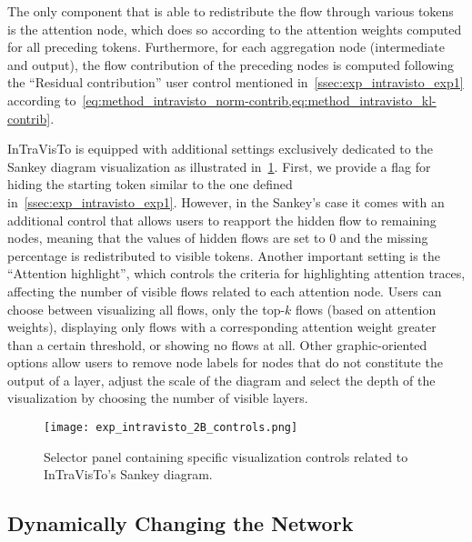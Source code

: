 The only component that is able to redistribute the flow through various tokens is the attention node, which does so according to the attention weights computed for all preceding tokens.
Furthermore, for each aggregation node (intermediate and output), the flow contribution of the preceding nodes is computed following the ``Residual contribution'' user control mentioned in~\cref{ssec:exp_intravisto_exp1} according to~\cref{eq:method_intravisto_norm-contrib,eq:method_intravisto_kl-contrib}.

InTraVisTo is equipped with additional settings exclusively dedicated to the Sankey diagram visualization as illustrated in~\cref{fig:exp_intravisto_2_B}.
First, we provide a flag for hiding the starting token similar to the one defined in~\cref{ssec:exp_intravisto_exp1}.
However, in the Sankey's case it comes with an additional control that allows users to reapport the hidden flow to remaining nodes, meaning that the values of hidden flows are set to $0$ and the missing percentage is redistributed to visible tokens.
Another important setting is the ``Attention highlight'', which controls the criteria for highlighting attention traces, affecting the number of visible flows related to each attention node.
Users can choose between visualizing all flows, only the top-$k$ flows (based on attention weights), displaying only flows with a corresponding attention weight greater than a certain threshold, or showing no flows at all.
Other graphic-oriented options allow users to remove node labels for nodes that do not constitute the output of a layer, adjust the scale of the diagram and select the depth of the visualization by choosing the number of visible layers.

\begin{figure}[t!]
    \centering
    \texttt{[image: exp\_intravisto\_2B\_controls.png]}
    \caption{Selector panel containing specific visualization controls related to InTraVisTo's Sankey diagram.}
    \label{fig:exp_intravisto_2_B}
\end{figure}

\subsection{Dynamically Changing the Network}\label{ssec:exp_intravisto_exp3}

